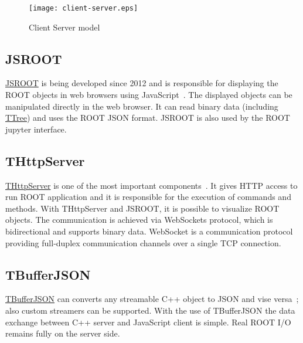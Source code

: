 \documentclass[a4paper]{jpconf}
\begin{document}
\begin{figure}[h]
  \begin{center}
    \texttt{[image: client-server.eps]}\hspace{2pc}%
  \end{center}
  \centering
\begin{minipage}[b]{20pc}\caption{\label{label}Client Server model}
\end{minipage}
\end{figure}

\subsection{JSROOT}

\href{https://github.com/root-project/jsroot/}{JSROOT} is being developed since 2012 and is responsible for displaying the ROOT objects in web browsers using JavaScript~\cite{jsroot}. The displayed objects can be manipulated directly in the web browser. It can read binary data (including \href{https://root.cern.ch/doc/master/classTTree.html}{TTree}) and uses the ROOT JSON format. JSROOT is also used by the ROOT jupyter interface.


\subsection{THttpServer}

\href{https://github.com/root-project/jsroot/blob/master/docs/HttpServer.md}{THttpServer} is one of the most important components~\cite{http}. It gives HTTP access to run ROOT application and it is responsible for the execution of commands and methods. With THttpServer and JSROOT, it is possible to visualize ROOT objects. The communication is achieved via WebSockets protocol, which is bidirectional and supports binary data. WebSocket is a communication protocol providing full-duplex communication channels over a single TCP connection.

\subsection{TBufferJSON}

\href{https://root.cern.ch/doc/master/classTBufferJSON.html}{TBufferJSON} can converts any streamable C++ object to JSON and vise versa~\cite{buffer}; also custom streamers can be supported. With the use of TBufferJSON the data exchange between C++ server and JavaScript client is simple. Real ROOT I/O remains fully on the server side.
\end{document}
